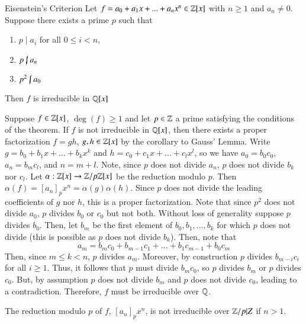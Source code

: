 \documentclass[12pt, a4paper, twoside, openright, titlepage]{book}
\begin{document}
\begin{namthm}{Eisenstein's Criterion}{}
    Let $f = a_0+a_1x+...+a_nx^n \in \mathbb Z[x]$ with $n \geq 1$ and $a_n \neq 0$. Suppose there exists a prime $p$ such that \begin{enumerate}
        \item $p\;\vert\;a_i$ for all $0 \leq i < n$,
        \item $p\;\cancel{\vert}\;a_n$
        \item $p^2\;\cancel{\vert}\;a_0$
    \end{enumerate}
    Then $f$ is irreducible in $\mathbb Q[x]$
\end{namthm}
\begin{proof*}{}{}
    Suppose $f \in \mathbb Z[x]$, $\deg(f) \geq 1$ and let $p \in \mathbb Z$ a prime satisfying the conditions of the theorem. If $f$ is not irreducible in $\mathbb Q[x]$, then there exists a proper factorization $f = gh$, $g,h \in \mathbb Z[x]$ by the corollary to Gauss' Lemma. Write $g = b_0+b_1x+...+b_kx^k$ and $h = c_0+c_1x+...+c_lx^l$, so we have $a_0 = b_0c_0$, $a_n = b_mc_l$, and $n = m+l$. Note, since $p$ does not divide $a_n$, $p$ does not divide $b_k$ nor $c_l$. Let $\alpha:\mathbb Z[x] \rightarrow \mathbb Z/p\mathbb Z[x]$ be the reduction modulo $p$. Then $\alpha(f) = [a_n]_px^n = \alpha(g)\alpha(h)$. Since $p$ does not divide the leading coefficients of $g$ nor $h$, this is a proper factorization. Note that since $p^2$ does not divide $a_0$, $p$ divides $b_0$ or $c_0$ but not both. Without loss of generality suppose $p$ divides $b_0$. Then, let $b_m$ be the first element of $b_0,b_1,...,b_k$ for which $p$ does not divide (this is possible as $p$ does not divide $b_k$). Then, note that $$a_m = b_mc_0 + b_{m-1}c_1 + ... + b_1c_{m-1} + b_0c_m$$ Then, since $m \leq k < n$, $p$ divides $a_m$. Moreover, by construction $p$ divides $b_{m-i}c_i$ for all $i \geq 1$. Thus, it follows that $p$ must divide $b_mc_0$, so $p$ divides $b_m$ or $p$ divides $c_0$. But, by assumption $p$ does not divide $b_m$ and $p$ does not divide $c_0$, leading to a contradiction. Therefore, $f$ must be irreducible over $\mathbb Q$.
\end{proof*}

\begin{note}{}{}
    The reduction modulo $p$ of $f$, $[a_n]_px^n$, is not irreducible over $\mathbb Z/p|Z$ if $n > 1$.
\end{note}
\end{document}
